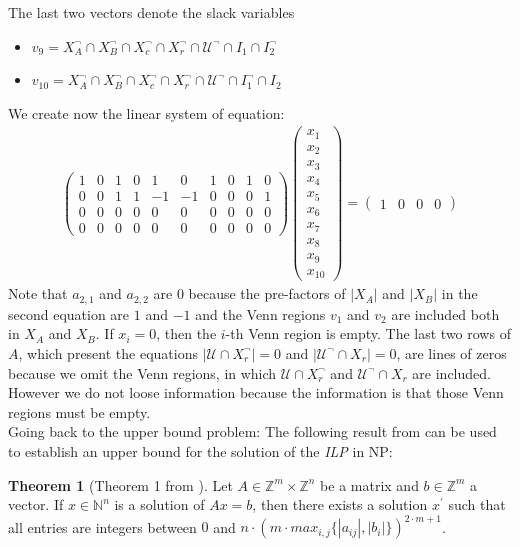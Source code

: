 \documentclass{book}
\theoremstyle{break}
\theoremstyle{definition}
\newtheorem{mythe}{Theorem}
\begin{document}
The last two vectors denote the slack variables
\begin{itemize}
\item $v_9=X_A^\neg\cap X_B^\neg\cap X_c^\neg\cap X_r^\neg\cap \mathcal{U}^\neg\cap I_1\cap I_2^\neg$
\item $v_{10}=X_A^\neg\cap X_B^\neg\cap X_c^\neg\cap X_r^\neg\cap \mathcal{U}^\neg\cap I_1^\neg\cap I_2$
\end{itemize}
We create now the linear system of equation:
\begin{align*}
\left ( \begin{array}{cccccccccc}
1&0&1&0&1&0&1&0&1&0\\
0&0&1&1&-1&-1&0&0&0&1\\
0&0&0&0&0&0&0&0&0&0\\
0&0&0&0&0&0&0&0&0&0
\end{array} \right )\left ( \begin{array}{c}
x_1\\x_2\\x_3\\x_4\\x_5\\x_6\\x_7\\x_8\\x_9\\x_{10}
\end{array}\right )=\left ( \begin{array}{cccc}
1&0&0&0
\end{array}\right )
\end{align*}
Note that $a_{2,1}$ and $a_{2,2}$ are $0$ because the pre-factors of $|X_A|$ and $|X_B|$ in the second equation are $1$ and $-1$ and the Venn regions $v_1$ and $v_2$ are included both in $X_A$ and $X_B$. If $x_i=0$, then the $i$-th Venn region is empty. The last two rows of $A$, which present the equations $|\mathcal{U}\cap X^\neg_r|=0$ and $|\mathcal{U}^\neg\cap X_r|=0$, are lines of zeros because we omit the Venn regions, in which $\mathcal{U}\cap X_r^\neg$ and $\mathcal{U}^\neg\cap X_r$ are included. However we do not loose information because the information is that those Venn regions must be empty.\\
Going back to the upper bound problem: The following result from \cite{knapsack} can be used to establish an upper bound for the solution of the \textit{ILP} in NP:
\begin{mythe}[Theorem 1 from \cite{knapsack}]\label{upper bound}
Let $A\in \mathbb{Z}^m\times \mathbb{Z}^n$ be a matrix and $b\in\mathbb{Z}^m$ a vector. If $x\in\mathbb{N}^n$ is a solution of $Ax=b$, then there exists a solution $x^\prime$ such that all entries are integers between $0$ and $n\cdot (m\cdot max_{i,j}\{|a_{ij}|,|b_i|\})^{2\cdot m+1}$.
\end{mythe}
\end{document}
